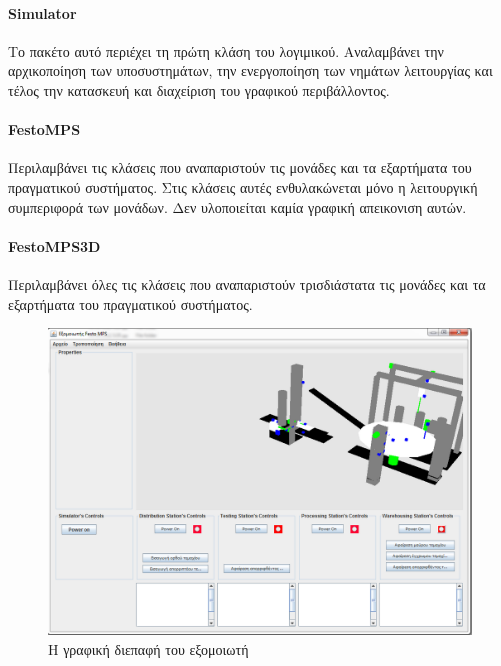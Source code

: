 \documentclass[a4paper,12pt,twoside]{report}
\begin{document}
\begin{appendices}
			\paragraph{Simulator} {Το πακέτο αυτό περιέχει τη πρώτη κλάση του λογιμικού. Αναλαμβάνει την αρχικοποίηση των υποσυστημάτων, την ενεργοποίηση των νημάτων λειτουργίας και τέλος την κατασκευή και διαχείριση του γραφικού περιβάλλοντος.
			}
			
			\paragraph{FestoMPS} {Περιλαμβάνει τις κλάσεις που αναπαριστούν τις μονάδες και τα εξαρτήματα του πραγματικού συστήματος. Στις κλάσεις αυτές ενθυλακώνεται μόνο η λειτουργική συμπεριφορά των μονάδων. Δεν υλοποιείται καμία γραφική απεικονιση αυτών.
			}
			
			\paragraph{FestoMPS3D} {Περιλαμβάνει όλες τις κλάσεις που αναπαριστούν τρισδιάστατα τις μονάδες και τα εξαρτήματα του πραγματικού συστήματος.
			}
			
			\begin{figure}[hp]
					\centering
					\includegraphics[scale=0.30]{FestoMPSSimulator.png}
					\caption{Η γραφική διεπαφή του εξομοιωτή}
					\label{φωτ:Η γραφική διεπαφή του εξομοιωτή}
				\end{figure}
		
\end{appendices}

	\cleardoublepage
	\label{κεφ.:Ξενόγλωσση Βιβλιογραφία}
	\printbibliography[title={Ξενόγλωσση Βιβλιογραφία}, keyword=english]
	
\end{document}
